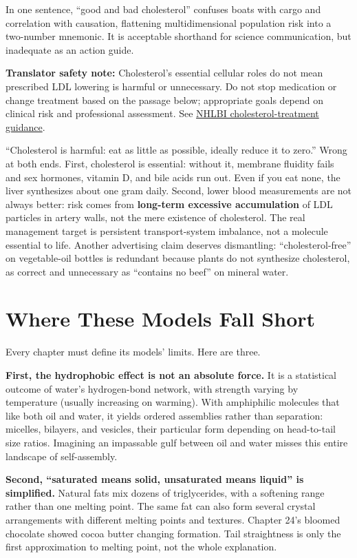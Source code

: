 In one sentence, ``good and bad cholesterol'' confuses boats with cargo and correlation with causation, flattening multidimensional population risk into a two-number mnemonic. It is acceptable shorthand for science communication, but inadequate as an action guide.

\textbf{Translator safety note:} Cholesterol's essential cellular roles do not mean prescribed LDL lowering is harmful or unnecessary. Do not stop medication or change treatment based on the passage below; appropriate goals depend on clinical risk and professional assessment. See \href{https://www.nhlbi.nih.gov/health/blood-cholesterol/treatment}{NHLBI cholesterol-treatment guidance}.

\begin{wuqu}
``Cholesterol is harmful: eat as little as possible, ideally reduce it to zero.'' Wrong at both ends. First, cholesterol is essential: without it, membrane fluidity fails and sex hormones, vitamin D, and bile acids run out. Even if you eat none, the liver synthesizes about one gram daily. Second, lower blood measurements are not always better: risk comes from \textbf{long-term excessive accumulation} of LDL particles in artery walls, not the mere existence of cholesterol. The real management target is persistent transport-system imbalance, not a molecule essential to life. Another advertising claim deserves dismantling: ``cholesterol-free'' on vegetable-oil bottles is redundant because plants do not synthesize cholesterol, as correct and unnecessary as ``contains no beef'' on mineral water.
\end{wuqu}

\section{Where These Models Fall Short}

Every chapter must define its models' limits. Here are three.

\textbf{First, the hydrophobic effect is not an absolute force.} It is a statistical outcome of water's hydrogen-bond network, with strength varying by temperature (usually increasing on warming). With amphiphilic molecules that like both oil and water, it yields ordered assemblies rather than separation: micelles, bilayers, and vesicles, their particular form depending on head-to-tail size ratios. Imagining an impassable gulf between oil and water misses this entire landscape of self-assembly.

\textbf{Second, ``saturated means solid, unsaturated means liquid'' is simplified.} Natural fats mix dozens of triglycerides, with a softening range rather than one melting point. The same fat can also form several crystal arrangements with different melting points and textures. Chapter 24's bloomed chocolate showed cocoa butter changing formation. Tail straightness is only the first approximation to melting point, not the whole explanation.


